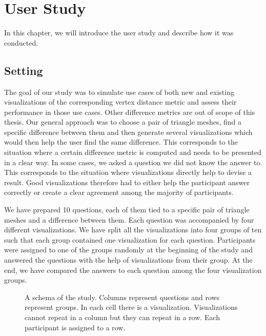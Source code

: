 \chapter{User Study}

In this chapter, we will introduce the user study and describe how it was conducted.

\section{Setting}
\label{sec:user_study-setting}

The goal of our study was to simulate use cases of both new and existing visualizations of the corresponding vertex distance metric and assess their performance in those use cases. Other difference metrics are out of scope of this thesis. Our general approach was to choose a pair of triangle meshes, find a specific difference between them and then generate several visualizations which would then help the user find the same difference. This corresponds to the situation where a certain difference metric is computed and needs to be presented in a clear way. In some cases, we asked a question we did not know the answer to. This corresponds to the situation where visualizations directly help to devise a result. Good visualizations therefore had to either help the participant answer correctly or create a clear agreement among the majority of participants.

We have prepared 10 questions, each of them tied to a specific pair of triangle meshes and a difference between them. Each question was accompanied by four different visualizations. We have split all the visualizations into four groups of ten such that each group contained one visualization for each question. Participants were assigned to one of the groups randomly at the beginning of the study and answered the questions with the help of visualizations from their group. At the end, we have compared the answers to each question among the four visualization groups.

\begin{figure}[h]
	\centering
	\def\svgwidth{\textwidth}
	
	\caption[Study Setting]{A schema of the study. Columns represent questions and rows represent groups. In each cell there is a visualization. Visualizations cannot repeat in a column but they can repeat in a row. Each participant is assigned to a row.}
	\label{fig:study_setting}
\end{figure}

